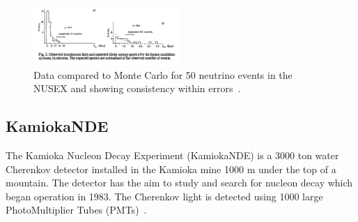 \begin{figure}[h!]
\centering
  \centering
\includegraphics[width=0.5\textwidth]{figures/nusexres.jpeg}
\vspace{2mm}
\caption{Data compared to Monte Carlo for 50 neutrino events in the NUSEX and showing consistency within errors~\cite{57NUSEX}.}
\label{fig:nusexres}
\end{figure}

\subsection{KamiokaNDE}
The Kamioka Nucleon Decay Experiment (KamiokaNDE) is a 3000 ton water Cherenkov detector installed in the Kamioka mine 1000 m under the top of a mountain. The detector has the aim to study and search for nucleon decay which began operation in 1983. The Cherenkov light is detected using 1000 large PhotoMultiplier Tubes (PMTs)~\cite{58KAMIOKA}.


